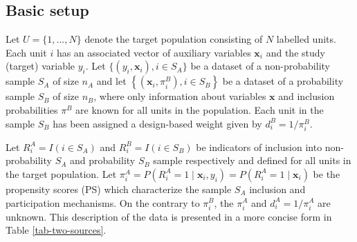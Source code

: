 \documentclass[
]{jss}
\begin{document}
\subsection{Basic setup}\label{basic-setup}

Let \(U=\{1,..., N\}\) denote the target population consisting of \(N\)
labelled units. Each unit \(i\) has an associated vector of auxiliary
variables \(\boldsymbol{x}_{i}\) and the study (target) variable
\(y_{i}\). Let \(\{ (y_i, \boldsymbol{x}_i), i \in S_A\}\) be a dataset
of a non-probability sample \(S_A\) of size \(n_A\) and let
\(\left\{\left(\boldsymbol{x}_i, \pi_{i}^B\right), i \in S_B\right\}\)
be a dataset of a probability sample \(S_B\) of size \(n_B\), where only
information about variables \(\boldsymbol{x}\) and inclusion
probabilities \(\pi^B\) are known for all units in the population. Each
unit in the sample \(S_B\) has been assigned a design-based weight given
by \(d_i^B = 1/\pi_i^B\).

Let \(R_i^A=I(i \in S_A)\) and \(R_i^B=I(i \in S_B)\) be indicators of
inclusion into non-probability \(S_A\) and probability \(S_B\) sample
respectively and defined for all units in the target population. Let
\(\pi_i^A=P(R_i^A=1 \mid \boldsymbol{x}_i, y_i)=P(R_i^A=1 \mid \boldsymbol{x}_i)\)
be the propensity scores (PS) which characterize the sample \(S_A\)
inclusion and participation mechanisms. On the contrary to \(\pi_i^B\),
the \(\pi_i^A\) and \(d_i^A=1/\pi_i^A\) are unknown. This description of
the data is presented in a more concise form in Table
\ref{tab-two-sources}.

\begin{table}[ht!]
    \centering
    \caption{Two sample setting}
    \label{tab-two-sources}
\end{table}
\end{document}

